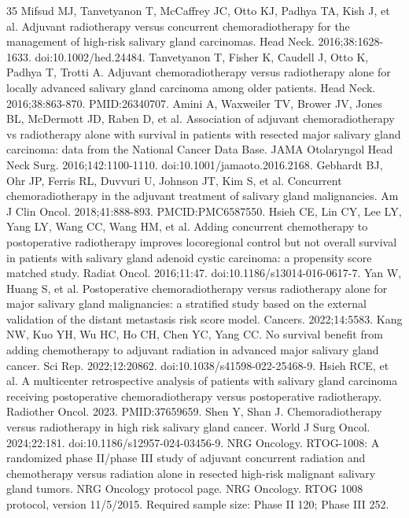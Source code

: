 \documentclass[10pt,twocolumn]{article}
\begin{document}
\begin{thebibliography}{35}
 Mifsud MJ, Tanvetyanon T, McCaffrey JC, Otto KJ, Padhya TA, Kish J, et al. Adjuvant radiotherapy versus concurrent chemoradiotherapy for the management of high-risk salivary gland carcinomas. Head Neck. 2016;38:1628-1633. doi:10.1002/hed.24484.
 Tanvetyanon T, Fisher K, Caudell J, Otto K, Padhya T, Trotti A. Adjuvant chemoradiotherapy versus radiotherapy alone for locally advanced salivary gland carcinoma among older patients. Head Neck. 2016;38:863-870. PMID:26340707.
 Amini A, Waxweiler TV, Brower JV, Jones BL, McDermott JD, Raben D, et al. Association of adjuvant chemoradiotherapy vs radiotherapy alone with survival in patients with resected major salivary gland carcinoma: data from the National Cancer Data Base. JAMA Otolaryngol Head Neck Surg. 2016;142:1100-1110. doi:10.1001/jamaoto.2016.2168.
 Gebhardt BJ, Ohr JP, Ferris RL, Duvvuri U, Johnson JT, Kim S, et al. Concurrent chemoradiotherapy in the adjuvant treatment of salivary gland malignancies. Am J Clin Oncol. 2018;41:888-893. PMCID:PMC6587550.
 Hsieh CE, Lin CY, Lee LY, Yang LY, Wang CC, Wang HM, et al. Adding concurrent chemotherapy to postoperative radiotherapy improves locoregional control but not overall survival in patients with salivary gland adenoid cystic carcinoma: a propensity score matched study. Radiat Oncol. 2016;11:47. doi:10.1186/s13014-016-0617-7.
 Yan W, Huang S, et al. Postoperative chemoradiotherapy versus radiotherapy alone for major salivary gland malignancies: a stratified study based on the external validation of the distant metastasis risk score model. Cancers. 2022;14:5583.
 Kang NW, Kuo YH, Wu HC, Ho CH, Chen YC, Yang CC. No survival benefit from adding chemotherapy to adjuvant radiation in advanced major salivary gland cancer. Sci Rep. 2022;12:20862. doi:10.1038/s41598-022-25468-9.
 Hsieh RCE, et al. A multicenter retrospective analysis of patients with salivary gland carcinoma receiving postoperative chemoradiotherapy versus postoperative radiotherapy. Radiother Oncol. 2023. PMID:37659659.
 Shen Y, Shan J. Chemoradiotherapy versus radiotherapy in high risk salivary gland cancer. World J Surg Oncol. 2024;22:181. doi:10.1186/s12957-024-03456-9.
 NRG Oncology. RTOG-1008: A randomized phase II/phase III study of adjuvant concurrent radiation and chemotherapy versus radiation alone in resected high-risk malignant salivary gland tumors. NRG Oncology protocol page.
 NRG Oncology. RTOG 1008 protocol, version 11/5/2015. Required sample size: Phase II 120; Phase III 252.

\end{thebibliography}
\end{document}
